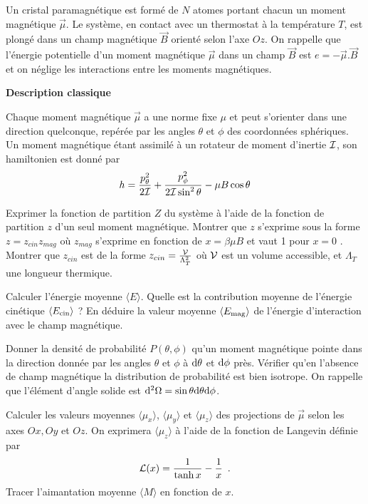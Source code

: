 Un cristal paramagnétique est formé de $N$ atomes portant chacun un moment magnétique $\overrightarrow{\mu}$. Le système, en contact avec un thermostat à la température $T$, est plongé dans un champ magnétique $\overrightarrow{B}$ orienté selon l'axe $Oz$.  On rappelle que l'énergie potentielle d'un moment magnétique $\overrightarrow{\mu}$ dans un champ $\overrightarrow{B}$ est $e=-\overrightarrow{\mu}.\overrightarrow{B}$ et on néglige les interactions entre les moments magnétiques.

\medskip

{\sffamily\bfseries{Description classique}}

Chaque moment magnétique $\overrightarrow{\mu}$ a une norme fixe $\mu$ et peut s'orienter dans une direction quelconque, repérée par les angles $\theta$ et $\phi$ des coordonnées sphériques. Un moment magnétique étant assimilé à un rotateur de moment d'inertie $\cal I$, son hamiltonien est donné par
$$
h=\frac{p_{\theta}^2}{2 {\cal I}} + \frac{p_{\phi}^2}{2 {\cal I}\sin^{2} \theta} -\mu B \cos \theta
$$

\question
Exprimer la fonction de partition $Z$ du système à l'aide de la fonction de partition $z$ d'un seul moment magnétique. Montrer que $z$ s'exprime sous la forme $z=z_{cin}z_{mag}$ où $z_{mag}$ s'exprime en fonction de $x=\beta \mu B$ et vaut 1 pour $x=0$ . Montrer que $z_{cin}$ est de la forme $z_{cin}=\frac{\cal V}{\Lambda_T^2}$ où $\cal V$ est un \og volume accessible\fg, et $\Lambda_T$ une longueur  thermique.

\question
Calculer l'énergie moyenne $\langle E \rangle$. Quelle est la contribution moyenne de l'énergie cinétique $\langle E_{\rm cin} \rangle$ ? En déduire la valeur moyenne $\langle E_{\rm mag}\rangle $ de l'énergie d'interaction avec le champ magnétique.

\question
Donner la densité de probabilité $P(\theta, \phi)$ qu'un moment magnétique pointe dans la direction donnée par les angles $\theta$ et $\phi$ à ${\rm d}\theta$ et ${\rm d}\phi$ près. Vérifier qu'en l'absence de champ magnétique la distribution de probabilité est bien isotrope. On rappelle que l'élément d'angle solide est ${\rm d}^2 \Omega= \sin \theta {\rm d} \theta {\rm d} \phi$.

\question
Calculer les valeurs moyennes $\langle \mu_x \rangle$, $\langle \mu_y \rangle$ et $\langle \mu_z \rangle$ des projections de $\overrightarrow{\mu}$ selon les axes $Ox, Oy$ et $Oz$. On exprimera $\langle \mu_z \rangle$ à l'aide de la fonction de Langevin définie par
$$
{\cal L}(x)=\frac{1}{\tanh x}-\frac{1}{x}\enspace.
$$
Tracer l'aimantation moyenne $\langle M \rangle$ en fonction de $x$.

